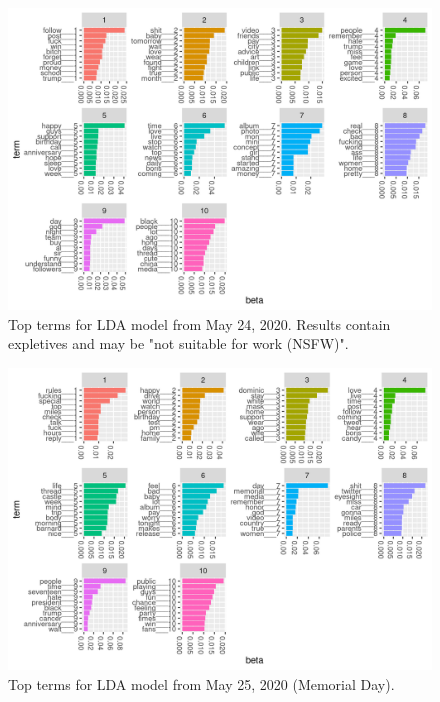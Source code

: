 \documentclass[
]{article}
\begin{document}
\begin{figure}
\includegraphics[width=29.17in]{../results/beta-2020-05-24} \caption{Top terms for LDA model from May 24, 2020. Results contain expletives and may be "not suitable for work (NSFW)".}\label{fig:may24}
\end{figure}

\begin{figure}
\includegraphics[width=29.17in]{../results/beta-2020-05-25} \caption{Top terms for LDA model from May 25, 2020 (Memorial Day).}\label{fig:may25}
\end{figure}
\end{document}
